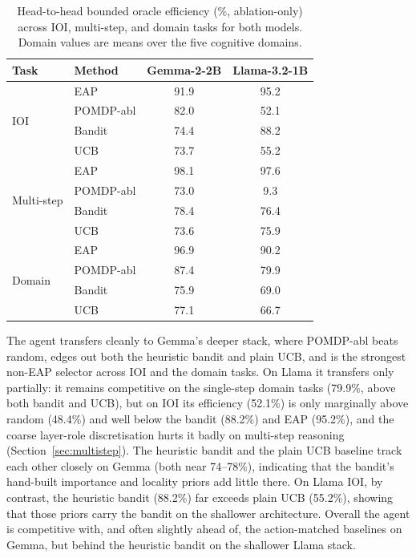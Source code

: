\begin{table}[H]
\centering
\caption{Head-to-head bounded oracle efficiency (\%, ablation-only)
across IOI, multi-step, and domain tasks for both models. Domain values
are means over the five cognitive domains.}
\label{tab:crossmodel}
{\small
\begin{tabular}{llcc}
\toprule
\textbf{Task} & \textbf{Method} & \textbf{Gemma-2-2B} & \textbf{Llama-3.2-1B} \\
\midrule
\multirow{4}{*}{IOI}
 & EAP       & 91.9 & 95.2 \\
 & POMDP-abl & 82.0 & 52.1 \\
 & Bandit    & 74.4 & 88.2 \\
 & UCB       & 73.7 & 55.2 \\
\midrule
\multirow{4}{*}{Multi-step}
 & EAP       & 98.1 & 97.6 \\
 & POMDP-abl & 73.0 & \phantom{0}9.3 \\
 & Bandit    & 78.4 & 76.4 \\
 & UCB       & 73.6 & 75.9 \\
\midrule
\multirow{4}{*}{Domain}
 & EAP       & 96.9 & 90.2 \\
 & POMDP-abl & 87.4 & 79.9 \\
 & Bandit    & 75.9 & 69.0 \\
 & UCB       & 77.1 & 66.7 \\
\bottomrule
\end{tabular}%
}
\end{table}

The agent transfers cleanly to Gemma's deeper stack, where POMDP-abl
beats random, edges out both the heuristic bandit and plain UCB, and is
the strongest non-EAP selector across IOI and the domain tasks.  On
Llama it transfers only partially: it remains competitive on the
single-step domain tasks (79.9\%, above both bandit and UCB), but on
IOI its efficiency (52.1\%) is only marginally above random (48.4\%)
and well below the bandit (88.2\%) and EAP (95.2\%), and the coarse
layer-role discretisation hurts it badly on multi-step reasoning
(Section~\ref{sec:multistep}).  The heuristic
bandit and the plain UCB baseline track each other closely on Gemma
(both near 74--78\%), indicating that the bandit's hand-built importance
and locality priors add little there. On Llama IOI, by contrast, the heuristic
bandit (88.2\%) far exceeds plain UCB (55.2\%), showing that those priors
carry the bandit on the shallower architecture.  Overall the agent is
competitive with, and often slightly ahead of, the action-matched
baselines on Gemma, but behind the heuristic bandit on the shallower
Llama stack.


